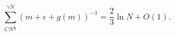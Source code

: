 \begin{equation}
\label{Eq_A33}
\sum^{\gamma N}_{CN^{\frac{1}{3}}} (m + \epsilon + g(m))^{-1}
  = \frac{2}{3} \ln N + O(1).
\end{equation}

